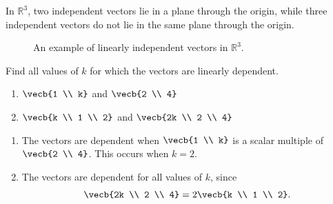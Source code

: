 In $\mathbb{R}^3$, two independent vectors lie in a plane through the origin, while three independent vectors do not lie in the same plane through the origin.
\begin{figure}[H]
    \centering

    
    \caption{An example of linearly independent vectors in $\mathbb{R}^3$.}
    \label{fig:example-dependence-2}
\end{figure}

\begin{Exercise}[title = Values Causing Dependence, label = indep3]
Find all values of $k$ for which the vectors are linearly dependent.
\begin{enumerate}
\item $\vecb{1 \\ k}$ and $\vecb{2 \\ 4}$
\item $\vecb{k \\ 1 \\ 2}$ and $\vecb{2k \\ 2 \\ 4}$
\end{enumerate}
\end{Exercise}

\begin{Answer}[ref = indep3]
\begin{enumerate}
\item The vectors are dependent when $\vecb{1 \\ k}$ is a scalar multiple of $\vecb{2 \\ 4}$.
This occurs when $k = 2$.
\item The vectors are dependent for all values of $k$, since
\[
\vecb{2k \\ 2 \\ 4} = 2\vecb{k \\ 1 \\ 2}.
\]
\end{enumerate}
\end{Answer}



